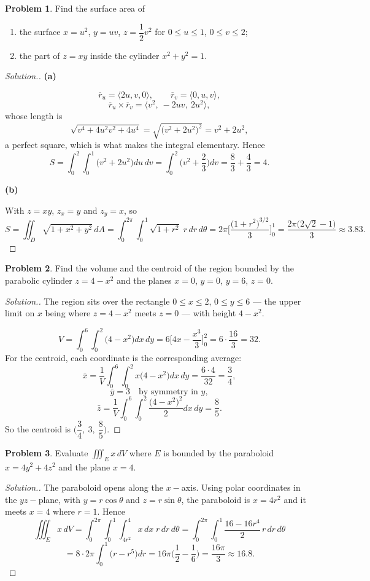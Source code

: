 \documentclass[11pt,a4paper]{article}
\theoremstyle{definition}
\newtheorem{problemx}{Problem}[subsection]
\newenvironment{problem}{\begin{problemx}}{\end{problemx}}
\newenvironment{solution}
  {\renewcommand{\qedsymbol}{}\begin{proof}[\textit{Solution}.]}
  {\end{proof}}
\newcommand{\subhead}[1]{%
  \par\medskip\noindent\textbf{#1}\par\nobreak\smallskip}
\begin{document}
\begin{problem}
Find the surface area of
\begin{enumerate}
\item[(a)] the surface $x = u^2$, $y = uv$, $z = \dfrac12v^2$ for
$0\leq u\leq 1$, $0\leq v\leq 2$;
\item[(b)] the part of $z = xy$ inside the cylinder $x^2+y^2 = 1$.
\end{enumerate}
\end{problem}
\begin{solution}
\subhead{(a)}
$$\overline{r}_u = \langle 2u, v, 0\rangle,\qquad
\overline{r}_v = \langle 0, u, v\rangle ,$$
$$\overline{r}_u\times\overline{r}_v = \langle v^2,\ -2uv,\ 2u^2\rangle ,$$
whose length is
$$\sqrt{v^4+4u^2v^2+4u^4} = \sqrt{\big(v^2+2u^2\big)^2} = v^2+2u^2 ,$$
a perfect square, which is what makes the integral elementary. Hence
$$S = \int_0^2\int_0^1\big(v^2+2u^2\big)du\,dv
= \int_0^2\Big(v^2+\frac23\Big)dv = \frac83+\frac43 = 4 .$$

\subhead{(b)}
With $z = xy$, $z_x = y$ and $z_y = x$, so
$$S = \iint_D\sqrt{1+x^2+y^2}\,dA
= \int_0^{2\pi}\int_0^1\sqrt{1+r^2}\;r\,dr\,d\theta
= 2\pi\Big[\frac{\big(1+r^2\big)^{3/2}}{3}\Big]_0^1
= \frac{2\pi\big(2\sqrt2-1\big)}{3}\approx 3.83 .$$
\end{solution}

\begin{problem}
Find the volume and the centroid of the region bounded by the parabolic cylinder
$z = 4-x^2$ and the planes $x=0$, $y=0$, $y=6$, $z=0$.
\end{problem}
\begin{solution}
The region sits over the rectangle $0\leq x\leq 2$, $0\leq y\leq 6$ --- the
upper limit on $x$ being where $z=4-x^2$ meets $z=0$ --- with height $4-x^2$.

$$V = \int_0^6\int_0^2\big(4-x^2\big)dx\,dy
= 6\Big[4x-\frac{x^3}{3}\Big]_0^2 = 6\cdot\frac{16}{3} = 32 .$$
For the centroid, each coordinate is the corresponding average:
$$\bar x = \frac{1}{V}\int_0^6\int_0^2x\big(4-x^2\big)dx\,dy
= \frac{6\cdot 4}{32} = \frac34 ,$$
$$\bar y = 3 \quad\text{by symmetry in } y ,$$
$$\bar z = \frac{1}{V}\int_0^6\int_0^2\frac{\big(4-x^2\big)^2}{2}dx\,dy
= \frac{8}{5}.$$
So the centroid is $\Big(\dfrac34,\ 3,\ \dfrac85\Big)$.
\end{solution}

\begin{problem}
Evaluate $\displaystyle{\iiint_E x\,dV}$ where $E$ is bounded by the paraboloid
$x = 4y^2+4z^2$ and the plane $x=4$.
\end{problem}
\begin{solution}
The paraboloid opens along the $x-$axis. Using polar coordinates in the
$yz-$plane, with $y = r\cos\theta$ and $z = r\sin\theta$, the paraboloid is
$x = 4r^2$ and it meets $x=4$ where $r=1$. Hence
$$\iiint_E x\,dV
= \int_0^{2\pi}\int_0^1\int_{4r^2}^{4}x\,dx\;r\,dr\,d\theta
= \int_0^{2\pi}\int_0^1\frac{16-16r^4}{2}\,r\,dr\,d\theta$$
$$= 8\cdot 2\pi\int_0^1\big(r-r^5\big)dr
= 16\pi\Big(\frac12-\frac16\Big) = \frac{16\pi}{3}\approx 16.8 .$$
\end{solution}
\end{document}

